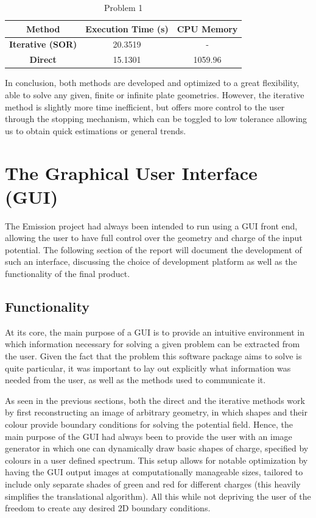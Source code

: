 \documentclass[a4paper]{article}
\begin{document}
\begin{table}[h!]
\centering
\begin{tabular}{c | c c }
\textbf{Method} & \textbf{Execution Time (s)} & \textbf{CPU Memory}\\
\hline
\textbf{Iterative (SOR)} &  20.3519 & - \\
\textbf{Direct} & 15.1301  & 1059.96\\
\end{tabular}
\caption{Problem 1}
\end{table}
In conclusion, both methods are developed and optimized to a great flexibility, 
able to solve any given, finite or infinite plate geometries. However, the 
iterative method is slightly more time inefficient, but offers more control 
to the user through the stopping mechanism, which can be toggled to low 
tolerance allowing us to obtain quick estimations or general trends.



\section*{The Graphical User Interface (GUI)}

The Emission project had always been intended to run using a GUI front end, 
allowing the user to have full control over the geometry and charge of the 
input potential. The following section of the report will document the 
development of such an interface, discussing the choice of development platform 
as well as the functionality of the final product.


\subsection*{Functionality}

At its core, the main purpose of a GUI is to provide an intuitive environment 
in which information necessary for solving a given problem can be extracted 
from the user. Given the fact that the problem this software package aims to 
solve is quite particular, it was important to lay out explicitly what 
information was needed from the user, as well as the methods used to 
communicate it.


As seen in the previous sections, both the direct and the iterative methods 
work by first reconstructing an image of arbitrary geometry, in which shapes 
and their colour provide boundary conditions for solving the potential field. 
Hence, the main purpose of the GUI had always been to provide the user with an 
image generator in which one can dynamically draw basic shapes of charge, 
specified by colours in a user defined spectrum. This setup allows for notable 
optimization by having the GUI output images at computationally manageable 
sizes, tailored to include only separate shades of green and red for different 
charges (this heavily simplifies the translational algorithm). All this while 
not depriving the user of the freedom to create any desired 2D boundary 
conditions.
\end{document}
